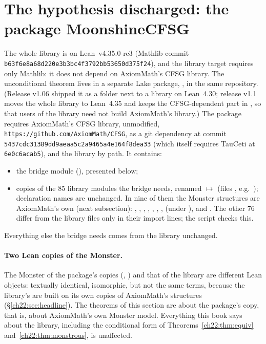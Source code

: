\section{The hypothesis discharged: the package MoonshineCFSG}\label{ch22:sec:discharged}

The whole library is on Lean~v4.35.0-rc3 (Mathlib commit \texttt{b63f6e8a68d220e3b3bc4f3792bb53650d375f24}), and the
library target  requires only Mathlib: it does not depend on AxiomMath's CFSG library.  The unconditional theorem
lives in a separate Lake package, , in the same repository.  (Release v1.06 shipped it as a folder
 next to a library on Lean~4.30; release v1.1 moves the whole library to Lean~4.35 and keeps the
CFSG-dependent part in , so that users of the library need not build AxiomMath's library.)  The
package requires AxiomMath's CFSG library, unmodified, \texttt{https://github.com/AxiomMath/CFSG}, as a git dependency at
commit \texttt{5437cdc31389dd9aeaa5c2a9465a4e164f8dea33} (which itself requires TauCeti at \texttt{6e0c6acab5}), and the
library  by path.  It contains:
\begin{itemize}
\item the bridge module 
  (), presented below;
\item copies of the $85$ library modules the bridge needs, renamed  $\mapsto$ 
  (files , e.g.\ );
  declaration names are unchanged.  In nine of them the Monster structures are AxiomMath's own (next subsection):
  , , , , ,
  , ,  (under ), and
  .  The other $76$ differ from the library files only in their import lines; the script
   checks this.
\end{itemize}
Everything else the bridge needs comes from the library unchanged.

\paragraph{Two Lean copies of the Monster.}  The Monster of the package's copies (, ) and
that of the library are different Lean objects: textually identical, isomorphic, but not the same terms, because the
library's are built on its own copies of AxiomMath's structures (\S\ref{ch22:sec:headline}).  The theorems of this section
are about the package's copy, that is, about AxiomMath's own Monster model.  Everything this book says about the library,
including the conditional form of Theorems~\ref{ch22:thm:equiv} and~\ref{ch22:thm:monstrous}, is unaffected.

